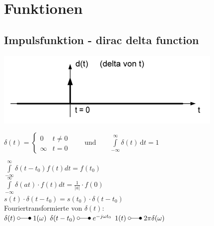 \section{Funktionen}
	
	\subsection{Impulsfunktion - dirac delta function}
		\begin{minipage}{0.2\textwidth}
			\includegraphics[width=\textwidth]{./bilder/funktionen/diracimpulse.png}
		\end{minipage}
		\qquad
		\begin{minipage}{0.45\textwidth}
			$\delta (t)=\begin{cases} 0 & t\ne 0\\\infty & t=0\end{cases} \qquad
			\text{und} \qquad \int\limits_{-\infty}^\infty \delta(t) \, \mathrm dt = 1 $\\
		\end{minipage}
		\qquad
		\begin{minipage}{0.25\textwidth}						
				$\int\limits_{-\infty}^{\infty}\delta(t-t_0)f(t)dt=f(t_0)$\\
	$\int\limits_{-\infty}^{\infty}\delta(at)\cdot f(t) dt = \frac{1}{|a|} \cdot f(0)$\\
	$s(t) \cdot \delta(t-t_0) = s(t_0)\cdot \delta(t-t_0)$\\
	Fouriertransformierte von $\delta(t)$:\\
	$\delta(t) \; \laplace \; 1(\omega)$ \hspace{0.5cm}
	$\delta(t-t_0) \; \laplace \; e^{-j\omega t_0}$ \hspace{0.5cm}
	$1(t) \; \laplace \; 2\pi \delta(\omega)$
		\end{minipage}
	
